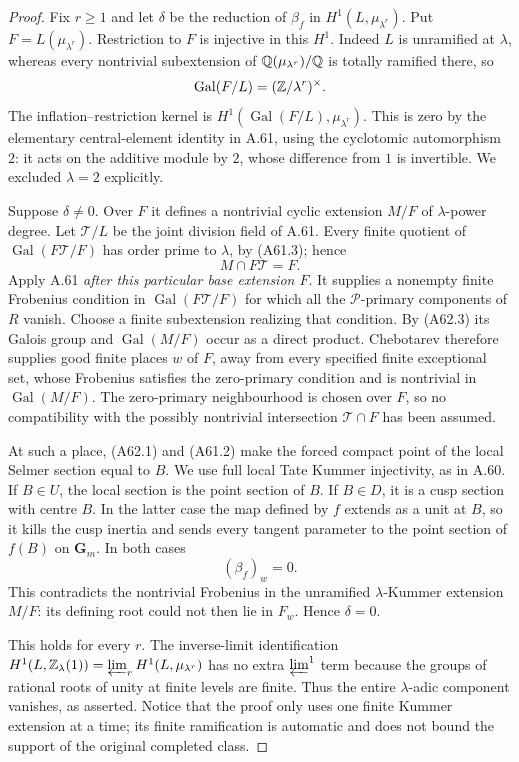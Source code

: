 \begin{proof}
Fix $r\ge1$ and let $\delta$ be the reduction of $\beta_f$ in
$H^1(L,\mu_{\lambda^r})$. Put $F=L(\mu_{\lambda^r})$.
Restriction to $F$ is injective in this $H^1$. Indeed $L$ is
unramified at $\lambda$, whereas every nontrivial subextension
of $\mathbb Q(\mu_{\lambda^r})/\mathbb Q$ is totally ramified there, so
\[
 \operatorname{Gal}(F/L)=(\mathbb Z/\lambda^r)^\times.
\]
The inflation--restriction kernel is
$H^1(\operatorname{Gal}(F/L),\mu_{\lambda^r})$.
This is zero by the elementary central-element identity in
A.61, using the cyclotomic automorphism $2$: it acts on the
additive module by $2$, whose difference from $1$ is invertible.
We excluded $\lambda=2$ explicitly.

Suppose $\delta\ne0$. Over $F$ it defines a nontrivial cyclic
extension $M/F$ of $\lambda$-power degree. Let $\mathcal T/L$
be the joint division field of A.61. Every finite quotient of
$\operatorname{Gal}(F\mathcal T/F)$ has order prime to
$\lambda$, by (A61.3); hence
\[
 M\cap F\mathcal T=F.
 \tag{A62.3}
\]
Apply A.61 \emph{after this particular base extension $F$}.
It supplies a nonempty finite Frobenius condition in
$\operatorname{Gal}(F\mathcal T/F)$ for which all the
$\mathcal P$-primary components of $R$ vanish. Choose a finite
subextension realizing that condition. By (A62.3) its Galois
group and $\operatorname{Gal}(M/F)$ occur as a direct product.
Chebotarev therefore supplies good finite places $w$ of $F$,
away from every specified finite exceptional set, whose
Frobenius satisfies the zero-primary condition and is nontrivial
in $\operatorname{Gal}(M/F)$. The zero-primary neighbourhood is
chosen over $F$, so no compatibility with the possibly nontrivial
intersection $\mathcal T\cap F$ has been assumed.

At such a place, (A62.1) and (A61.2) make the forced compact
point of the local Selmer section equal to $B$. We use full
local Tate Kummer injectivity, as in A.60. If $B\in U$, the
local section is the point section of $B$. If $B\in D$, it is
a cusp section with centre $B$. In the latter case the map
defined by $f$ extends as a unit at $B$, so it kills the cusp
inertia and sends every tangent parameter to the point section
of $f(B)$ on $\mathbf G_m$. In both cases
\[
 (\beta_f)_w=0.
\]
This contradicts the nontrivial Frobenius in the unramified
$\lambda$-Kummer extension $M/F$: its defining root could not
then lie in $F_w$. Hence $\delta=0$.

This holds for every $r$. The inverse-limit identification
$H^1(L,\mathbb Z_\lambda(1))=\varprojlim_rH^1(L,\mu_{\lambda^r})$
has no extra $\varprojlim^1$ term because the groups of rational
roots of unity at finite levels are finite. Thus the entire
$\lambda$-adic component vanishes, as asserted. Notice that
the proof only uses one finite Kummer extension at a time; its
finite ramification is automatic and does not bound the support
of the original completed class.
\end{proof}

